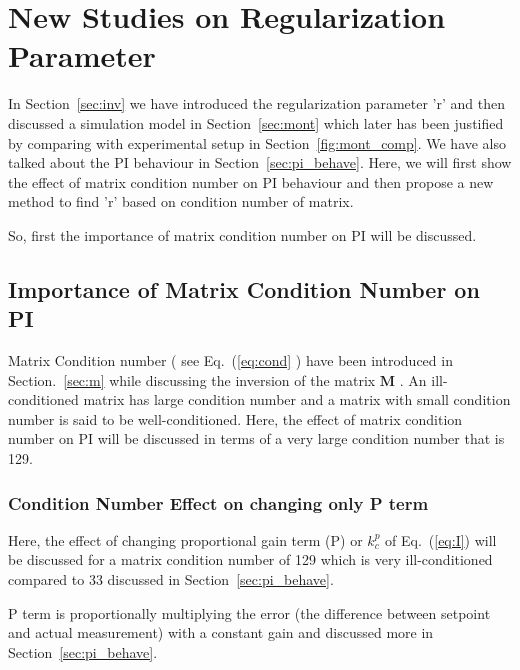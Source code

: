 \section{New Studies on Regularization Parameter}\label{sec:new_study_r}
In Section~\ref{sec:inv} we have introduced the regularization parameter 'r' and then discussed a simulation model in Section~\ref{sec:mont} which later has been justified by comparing with experimental setup in Section~\ref{fig:mont_comp}. We have also talked about the PI behaviour in Section~\ref{sec:pi_behave}. Here, we will first show the effect of matrix condition number on PI behaviour and then propose a new method to find 'r' based on condition number of matrix. 

So, first the importance of matrix condition number on PI will be discussed.

\subsection{Importance of Matrix Condition Number on PI}\label{sec:pi_behave_m}
Matrix Condition number ( see Eq.~(\ref{eq:cond} ) have been introduced in Section.~\ref{sec:m} while discussing the inversion of the matrix $\bm{M}$ . An ill-conditioned matrix has large condition number and a matrix with small condition number is said to be well-conditioned. Here, the effect of matrix condition number on PI will be discussed in terms of a very large condition number that is 129.
 
\subsubsection{Condition Number Effect on changing only P term}
Here, the effect of changing proportional gain term (P) or $k_c^p$ of Eq.~(\ref{eq:I}) will be discussed for a matrix condition number of 129 which is very ill-conditioned compared to 33 discussed in Section~\ref{sec:pi_behave}.

P term is proportionally multiplying the error (the difference between setpoint and actual measurement) with a constant gain and discussed more in Section~\ref{sec:pi_behave}.


